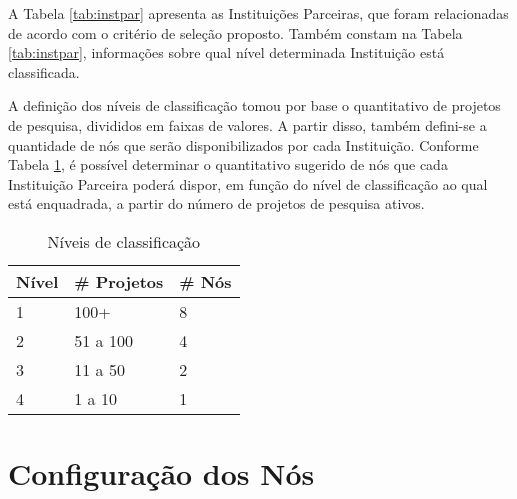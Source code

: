 \documentclass[tese,capa]{texufpel}
\begin{document}
A Tabela \ref{tab:instpar} apresenta as Instituições Parceiras, que foram relacionadas de acordo com o critério de seleção proposto. Também constam na Tabela \ref{tab:instpar}, informações sobre qual nível determinada Instituição está classificada.

A definição dos níveis de classificação tomou por base o quantitativo de projetos de pesquisa, divididos em faixas de valores. A partir disso, também defini-se a quantidade de nós que serão disponibilizados por cada Instituição. Conforme Tabela \ref{tab:noporinst}, é possível determinar o quantitativo sugerido de nós que cada Instituição Parceira poderá dispor, em função do nível de classificação ao qual está enquadrada, a partir do número de projetos de pesquisa ativos.

\begin{table}[H]
\centering
\caption{Níveis de classificação}
\label{tab:noporinst}
\begin{tabular}{@{}lll@{}}
\toprule
\textbf{Nível} & \textbf{\# Projetos} & \textbf{\# Nós} \\ \midrule
1              & 100+                 & 8               \\
2              & 51 a 100             & 4               \\
3              & 11 a 50              & 2               \\
4              & 1 a 10               & 1               \\ \bottomrule
\end{tabular}
\end{table}


\section{Configuração dos Nós}\label{sec:confnos}
\end{document}
